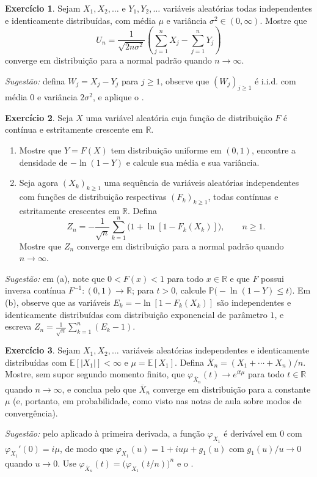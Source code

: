 \documentclass[12pt,portuguese]{article}
\theoremstyle{definition}
\theoremstyle{plainexercise}
\newtheorem{exercise}{Exercício}
\theoremstyle{starredexercise}
\theoremstyle{definition}
\begin{document}
\begin{exercise}\label{exercise:gw-8-prob-10}
Sejam $X_1,X_2,\ldots$ e $Y_1,Y_2,\ldots$ variáveis aleatórias todas
independentes e identicamente distribuídas, com média $\mu$ e variância
$\sigma^2\in(0,\infty)$. Mostre que
\[
  U_n=\frac{1}{\sqrt{2n\sigma^2}}
  \left(\sum_{j=1}^n X_j-\sum_{j=1}^n Y_j\right)
\]
converge em distribuição para a normal padrão quando $n\to\infty$.

\noindent\emph{Sugestão:} defina $W_j=X_j-Y_j$ para $j\geqslant1$, observe que
$(W_j)_{j\geqslant1}$ é i.i.d. com média $0$ e variância $2\sigma^2$, e aplique
o .
\end{exercise}

\begin{exercise}\label{exercise:gw-8-prob-24}
Seja $X$ uma variável aleatória cuja função de distribuição $F$ é contínua e
estritamente crescente em $\mathbb{R}$.
\begin{enumerate}[label=(\alph*)]
\item Mostre que $Y=F(X)$ tem distribuição uniforme em $(0,1)$, encontre a
densidade de $-\ln(1-Y)$ e calcule sua média e sua variância.
\item Seja agora $(X_k)_{k\geqslant1}$ uma sequência de variáveis aleatórias
independentes com funções de distribuição respectivas $(F_k)_{k\geqslant1}$, todas
contínuas e estritamente crescentes em $\mathbb{R}$. Defina
\[
  Z_n=-\frac{1}{\sqrt{n}}\sum_{k=1}^n\bigl(1+\ln[1-F_k(X_k)]\bigr),
  \qquad n\geqslant1.
\]
Mostre que $Z_n$ converge em distribuição para a normal padrão quando
$n\to\infty$.
\end{enumerate}

\noindent\emph{Sugestão:} em (a), note que $0<F(x)<1$ para todo $x\in\mathbb{R}$ e que
$F$ possui inversa contínua $F^{-1}\colon(0,1)\to\mathbb{R}$; para $t>0$,
calcule $\mathbb{P}\bigl(-\ln(1-Y)\leqslant t\bigr)$. Em (b), observe que as
variáveis $E_k=-\ln[1-F_k(X_k)]$ são independentes e identicamente
distribuídas com distribuição exponencial de parâmetro $1$, e escreva
$Z_n=\frac{1}{\sqrt{n}}\sum_{k=1}^n(E_k-1)$.
\end{exercise}

\begin{exercise}\label{exercise:gw-8-52}
Sejam $X_1,X_2,\ldots$ variáveis aleatórias independentes e identicamente
distribuídas com $\mathbb{E}[|X_1|]<\infty$ e $\mu=\mathbb{E}[X_1]$. Defina
$\overline{X}_n=(X_1+\cdots+X_n)/n$. Mostre, sem supor segundo momento finito,
que $\varphi_{\overline{X}_n}(t)\to e^{it\mu}$ para todo $t\in\mathbb{R}$ quando
$n\to\infty$, e conclua pelo  que $\overline{X}_n$
converge em distribuição para a constante $\mu$ (e, portanto, em probabilidade,
como visto nas notas de aula sobre modos de convergência).

\noindent\emph{Sugestão:} pelo  aplicado à primeira derivada, a função
$\varphi_{X_1}$ é derivável em $0$ com $\varphi_{X_1}'(0)=i\mu$, de modo que
$\varphi_{X_1}(u)=1+iu\mu+g_1(u)$ com $g_1(u)/u\to0$ quando $u\to0$. Use
$\varphi_{\overline{X}_n}(t)=\bigl(\varphi_{X_1}(t/n)\bigr)^n$ e o
.
\end{exercise}
\end{document}
